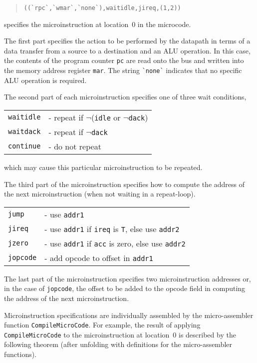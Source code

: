 \begin{quote}
\verb"((`rpc`,`wmar`,`none`),waitidle,jireq,(1,2))"
\end{quote}

\noindent
specifies the microinstruction at location~0 in the microcode.

The first part specifies the
action to be performed by the datapath in terms of a data transfer
from a source to a destination and an ALU operation.
In this case,
the contents of the program counter \verb"pc" are read onto the bus and
written into the memory address register \verb"mar".
The string \verb"`none`" indicates that no specific ALU operation is
required.

The second part of each microinstruction specifies one of three
wait conditions,

\begin{center}
\begin{tabular}{ll}
\verb"waitidle"& - repeat if $\neg$(\verb"idle" or $\neg$\verb"dack")\\
\verb"waitdack"& - repeat if $\neg$\verb"dack"\\
\verb"continue"& - do not repeat
\end{tabular}
\end{center}

\noindent
which may cause this particular microinstruction to
be repeated.

The third part of the microinstruction specifies how to compute
the address of the next microinstruction
(when not waiting in a repeat-loop).

\begin{center}
\begin{tabular}{ll}
\verb"jump"& - use \verb"addr1"\\
\verb"jireq"& - use \verb"addr1" if \verb"ireq" is \verb"T", else use \verb"addr2"\\
\verb"jzero"& - use \verb"addr1" if \verb"acc" is zero, else use \verb"addr2"\\
\verb"jopcode"& - add opcode to offset in \verb"addr1"
\end{tabular}
\end{center}

The last part of the microinstruction specifies two
microinstruction addresses or, in the case of \verb"jopcode",
the offset to be added to the opcode field in computing
the address of the next microinstruction.

Microinstruction specifications are individually assembled by
the micro-assembler function \verb"CompileMicroCode".
For example, the result of applying
\verb"CompileMicroCode" to the microinstruction at location~0
is described by the following theorem
(after unfolding with definitions for the micro-assembler functions).

